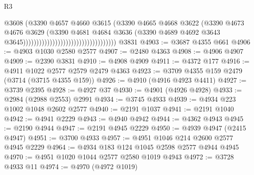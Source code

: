 \begin{lexlean}{R3}
\begin{coremodule}
                                                                @3608
                                                                (@3390
                                                                  @4657
                                                                  @4660
                                                                  @3615
                                                                  (@3390
                                                                    @4665
                                                                    @4668
                                                                    @3622
                                                                    (@3390
                                                                      @4673
                                                                      @4676
                                                                      @3629
                                                                      (@3390
                                                                        @4681
                                                                        @4684
                                                                        @3636
                                                                        (@3390
                                                                          @4689
                                                                          @4692
                                                                          @3643
                                                                          @3645)))))))))))))))))))))))))))))))))))
    @3831
@4903 := @3687 @4355 @661
@4906 := @4903 @1030 @2580 @2577
@4907 := @2480 @4363
@4908 := @4906 @4907
@4909 := @2390 @3831
@4910 := @4908 @4909
@4911 := @4372 @177
@4916 := @4911 @1022 @2577 @2579 @2479 @4363
@4923 := @3709 @4355 @159 @2479 (@3714 (@3715 @4355 @159))
@4926 := @4910 (@4916 @4923 @4411)
@4927 := @3739 @2395
@4928 := @4927 @37
@4930 := @4901 (@4926 @4928)
@4933 := @2984 (@2988 @2553) @2991
@4934 := @3745 @4933
@4939 := @4934 @223 @1002 @1048 @2602 @2577
@4940 := @2191 @1037
@4941 := @2191 @1040
@4942 := @4941 @2229
@4943 := @4940 @4942
@4944 := @4362 @4943
@4945 := @2190 @4944
@4947 := @2191 @4945 @2229
@4950 := @4939 @4947 (@2415 @4947)
@4951 := @3700 @4933
@4957 := @4951 @1046 @214 @2600 @2577 @4945 @2229
@4964 := @4934 @183 @124 @1045 @2598 @2577 @4944 @4945
@4970 := @4951 @1020 @1044 @2577 @2580 @1019 @4943
@4972 := @3728 @4933 @11
@4974 := @4970 (@4972 @1019)

\end{coremodule}
\end{lexlean}
